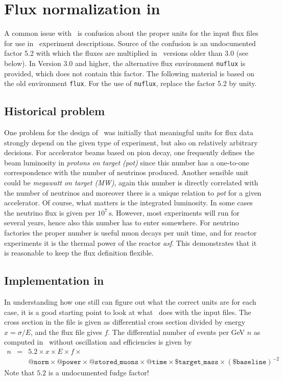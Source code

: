 \chapter{Flux normalization in \GLOBES }
\label{app:flux}

A common issue with \GLOBES\ is confusion about the proper units for
the input flux files for use in \AEDL\ experiment descriptions. Source of
the confusion is an undocumented factor 5.2 with which the fluxes
are multiplied in \GLOBES\ versions older than 3.0 (see below). In Version 3.0 and 
higher, the alternative flux environment {\tt nuflux} is provided, 
which does not contain this factor. The following material is
based on the old environment {\tt flux}. For the use of {\tt nuflux},
replace the factor 5.2 by unity.

\section*{Historical problem}

One problem for the design of \AEDL\ was initially that meaningful
units for flux data strongly depend on the given type of experiment,
but also on relatively arbitrary decisions. For accelerator beams
based on pion decay, one frequently defines the beam luminosity in
{\it protons on target (pot)} since this number has a one-to-one
correspondence with the number of neutrinos produced. Another sensible
unit could be {\it megawatt on target (MW)}, again this number is directly
correlated with the number of neutrinos and moreover there is a unique
relation to {\it pot} for a given accelerator. Of course,
what matters is the integrated luminosity. In some  cases the
neutrino flux is given per $10^7\,\mathrm{s}$. However,
most experiments will run for several years, hence also this number
has to enter somewhere. For neutrino factories the proper number is
useful muon decays per unit time, and for reactor experiments it is
the thermal power of the reactor {\it asf}. This demonstrates that it is
reasonable to keep the flux definition flexible.

\section*{Implementation in \GLOBES }

In understanding how one still can figure out what the correct units
are for each case, it is a good starting point to look at what
\GLOBES\ does with the input files. The cross section in the file is given as
differential cross section divided by energy $x=\sigma/E$, and the flux file
gives $f$. The differential number of events per GeV $n$ as computed in
\GLOBES\ without oscillation and efficiencies is given by
\begin{eqnarray}
n &=& 5.2\times x\times E\times f\times \nonumber \\
&&\mathtt{@norm}\times\mathtt{@power}\times\mathtt{@stored\_muons}\times\mathtt{@time}\times\mathtt{\$target\_mass}\times(\mathtt{\$baseline})^{-2} \nonumber
\end{eqnarray}
Note that $5.2$ is a undocumented fudge factor!

